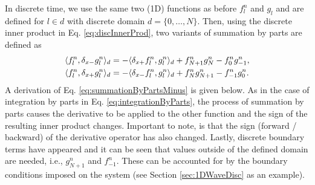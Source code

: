 In discrete time, we use the same two (1D) functions as before $f_l^n$ and $g_l$ and are defined for $l\in d$ with discrete domain $d=\{0, \hdots, N\}$. Then, using the discrete inner product in Eq. \eqref{eq:discInnerProd}, two variants of summation by parts are defined as
\begin{subequations}\label{eq:summationByParts}
    \begin{align}
        \langle f_l^n, \delta_{x-} g_l^n \rangle_d  &= -\langle \delta_{x+} f_l^n, g_l^n\rangle_d + f_{N+1}^ng_N^n - f_0^ng_{-1}^n,\label{eq:summationByPartsMinus}\\
        \langle f_l^n, \delta_{x+} g_l^n \rangle_d 
        &= -\langle \delta_{x-} f_l^n, g_l^n\rangle_d + f_N^ng_{N+1}^n - f_{-1}^ng_0^n.\label{eq:summationByPartsPlus}
    \end{align}
\end{subequations}
A derivation of Eq. \eqref{eq:summationByPartsMinus} is given below. As in the case of integration by parts in Eq. \eqref{eq:integrationByParts}, the process of summation by parts causes the derivative to be applied to the other function and the sign of the resulting inner product changes. Important to note, is that the sign (forward / backward) of the derivative operator has also changed. Lastly, discrete boundary terms have appeared and it can be seen that values outside of the defined domain are needed, i.e., $g_{N+1}^n$ and $f_{-1}^n$. These can be accounted for by the boundary conditions imposed on the system (see Section \ref{sec:1DWaveDisc} as an example). 

